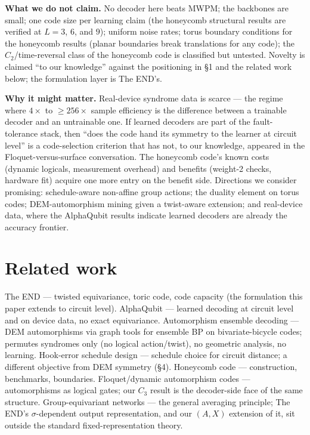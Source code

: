 \documentclass[11pt]{article}
\begin{document}
\textbf{What we do not claim.} No decoder here beats MWPM; the backbones are
small; one code size per learning claim (the honeycomb structural results
are verified at $L = 3$, $6$, and $9$); uniform noise rates; torus boundary
conditions for the honeycomb results (planar boundaries break translations
for any code); the $C_2$/time-reversal class of the honeycomb code is
classified but untested. Novelty is claimed ``to our knowledge'' against the
positioning in \S1 and the related work below; the formulation layer is The
END's.

\textbf{Why it might matter.} Real-device syndrome data is scarce --- the
regime where $4\times$ to $\geq 256\times$ sample efficiency is the
difference between a trainable decoder and an untrainable one. If learned
decoders are part of the fault-tolerance stack, then ``does the code hand
its symmetry to the learner at circuit level'' is a code-selection criterion
that has not, to our knowledge, appeared in the Floquet-versus-surface
conversation. The honeycomb code's known costs (dynamic logicals,
measurement overhead) and benefits (weight-2 checks, hardware fit) acquire
one more entry on the benefit side. Directions we consider promising:
schedule-aware non-affine group actions; the duality element on torus codes;
DEM-automorphism mining \cite{Koutsioumpas25} given a twist-aware extension;
and real-device data, where the AlphaQubit results \cite{Bausch24} indicate
learned decoders are already the accuracy frontier.

\section*{Related work}

The END \cite{Egorov23} --- twisted equivariance, toric code, code capacity
(the formulation this paper extends to circuit level). AlphaQubit
\cite{Bausch24} --- learned decoding at circuit level and on device data, no
exact equivariance. Automorphism ensemble decoding \cite{Koutsioumpas25} ---
DEM automorphisms via graph tools for ensemble BP on bivariate-bicycle
codes; permutes syndromes only (no logical action/twist), no geometric
analysis, no learning. Hook-error schedule design \cite{Kishony26,Fujiu25}
--- schedule choice for circuit distance; a different objective from DEM
symmetry (\S4). Honeycomb code \cite{HH21,Gidney21b,Haah22} ---
construction, benchmarks, boundaries. Floquet/dynamic automorphism codes
\cite{Davydova24,Kobayashi23} --- automorphisms as logical gates; our $C_3$
result is the decoder-side face of the same structure. Group-equivariant
networks \cite{Cohen16} --- the general averaging principle; The END's
$\sigma$-dependent output representation, and our $(A, X)$ extension of it,
sit outside the standard fixed-representation theory.
\end{document}
